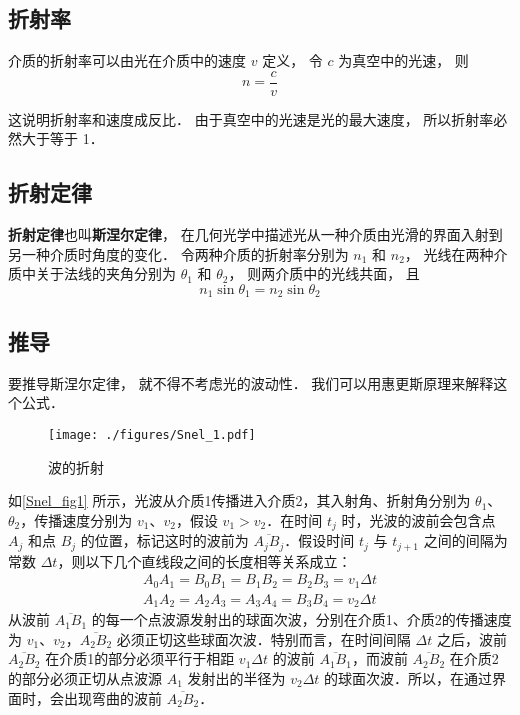 
\subsection{折射率}
介质的折射率可以由光在介质中的速度 $v$ 定义， 令 $c$ 为真空中的光速， 则
\begin{equation}
n = \frac{c}{v}
\end{equation} 

这说明折射率和速度成反比． 由于真空中的光速是光的最大速度， 所以折射率必然大于等于 1．

\subsection{折射定律}

\textbf{折射定律}也叫\textbf{斯涅尔定律}， 在几何光学中描述光从一种介质由光滑的界面入射到另一种介质时角度的变化． 令两种介质的折射率分别为 $n_1$ 和 $n_2$， 光线在两种介质中关于法线的夹角分别为 $\theta_1$ 和 $\theta_2$， 则两介质中的光线共面， 且
\begin{equation}
n_1 \sin\theta_1 = n_2 \sin\theta_2
\end{equation}


\subsection{推导}
要推导斯涅尔定律， 就不得不考虑光的波动性． 我们可以用惠更斯原理来解释这个公式．
\begin{figure}[ht]
\centering
\texttt{[image: ./figures/Snel\_1.pdf]}
\caption{波的折射} \label{Snel_fig1}
\end{figure}
如\autoref{Snel_fig1} 所示，光波从介质1传播进入介质2，其入射角、折射角分别为 $\theta_1$、$\theta_2$，传播速度分别为 $v_1$、$v_2$，假设 $v_1>v_2$．在时间 $t_{j}$ 时，光波的波前会包含点 $A_{j}$ 和点 $B_{j}$ 的位置，标记这时的波前为 $\overline {A_{j}B_{j}}$．假设时间 $t_{j}$ 与 $t_{{j+1}}$ 之间的间隔为常数 $\Delta t$，则以下几个直线段之间的长度相等关系成立：
\begin{equation}
\begin{aligned}
A_{0}A_{1}=B_{0}B_{1}=B_{1}B_{2}=B_{2}B_{3}=v_{1}\Delta t \\
A_{1}A_{2}=A_{2}A_{3}=A_{3}A_{4}=B_{3}B_{4}=v_{2}\Delta t
\end{aligned}
\end{equation}
从波前 $\overline {A_{1}B_{1}}$ 的每一个点波源发射出的球面次波，分别在介质1、介质2的传播速度为 $v_1$、$v_2$，$\overline {A_{2}B_{2}}$ 必须正切这些球面次波．特别而言，在时间间隔 $\Delta t$ 之后，波前 $\overline {A_{2}B_{2}}$ 在介质1的部分必须平行于相距 $v_{1}\Delta t$ 的波前 $\overline {A_{1}B_{1}}$，而波前 $\overline {A_{2}B_{2}}$ 在介质2的部分必须正切从点波源 $A_{1}$ 发射出的半径为 $v_{2}\Delta t$ 的球面次波．所以，在通过界面时，会出现弯曲的波前 $\overline {A_{2}B_{2}}$．

